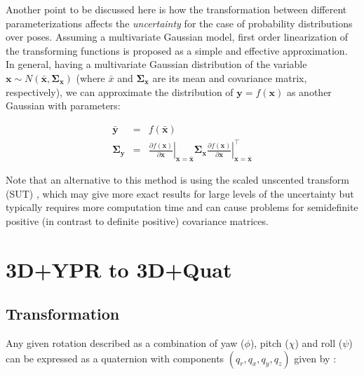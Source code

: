 \documentclass[a4paper,11pt]{report}
\begin{document}
Another point to be discussed here is how the transformation between different
parameterizations affects the \emph{uncertainty} for the case of probability distributions over poses.
Assuming a multivariate Gaussian model, first order
linearization of the transforming functions
is proposed as a simple and effective approximation.
In general, having a multivariate Gaussian distribution of the variable
$\mathbf{x} \sim N(\bar{\mathbf{x}},\mathbf{\Sigma_x})$ (where $\bar{x}$ and $\mathbf{\Sigma_x}$
are its mean and covariance matrix, respectively), we can approximate
the distribution of $\mathbf{y} = f(\mathbf{x})$ as another Gaussian
with parameters:

\begin{eqnarray}
 \bar{\mathbf{y}} &=& f(\bar{\mathbf{x}}) \\
 \mathbf{\Sigma_y} &=&
\left.\frac{\partial f(\mathbf{x})}{\partial \mathbf{x}}\right|_{\mathbf{x}=\bar{\mathbf{x}}}
\mathbf{\Sigma_x}
\left.\frac{\partial f(\mathbf{x})}{\partial \mathbf{x}}\right|_{\mathbf{x}=\bar{\mathbf{x}}}^\top
\end{eqnarray}



Note that an alternative to this method is using the scaled unscented
transform (SUT) \cite{julier2002sut}, which may give more exact results for
large levels of the uncertainty but typically requires more computation time
and can cause problems for semidefinite positive (in contrast to definite positive)
covariance matrices.

\section{3D+YPR to 3D+Quat }
\label{sect:ypr2quat}

\subsection{Transformation}

Any given rotation described as a combination of yaw ($\phi$),
pitch ($\chi$) and roll ($\psi$) can
be expressed as a quaternion with components $(q_r, q_x,q_y,q_z)$
given by \cite{horn2001some}:
\end{document}
